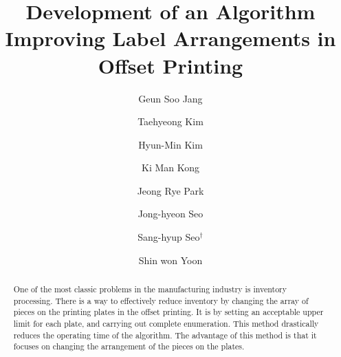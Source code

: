 \documentclass[a4paper]{amsart}
\title[Development of an Algorithm Improving Label Arrangements]{Development of an Algorithm Improving Label Arrangements in Offset Printing}
\author[G. S. Jang]{Geun Soo Jang}
\author[T. H. Kim]{Taehyeong Kim}
\author[H.-M. Kim]{Hyun-Min Kim}
\author[K. M. Kong]{Ki Man Kong}
\author[J. R. Park]{Jeong Rye Park}
\author[J.-H. Seo]{Jong-hyeon Seo}
\author[S.-H. Seo]{Sang-hyup Seo$^{\dagger}$}
\author[S. W. Yoon]{Shin won Yoon}
\numberwithin{equation}{section} %
\numberwithin{figure}{section} %
\numberwithin{table}{section}
\theoremstyle{plain}
\theoremstyle{definition}
\theoremstyle{plain}
\theoremstyle{plain}
\theoremstyle{plain}
\theoremstyle{plain}
\theoremstyle{plain}
\begin{document}
\begin{abstract}
One of the most classic problems in the manufacturing industry is inventory processing. 
There is a way to effectively reduce inventory by 
changing the array of pieces on the printing plates in the offset printing. 
It is by setting an acceptable upper limit for each plate, and carrying out complete enumeration. 
This method drastically reduces the operating time of the algorithm. 
The advantage of this method is that it focuses on changing the arrangement of the pieces on the plates.
\end{abstract}

\maketitle

\end{document}
